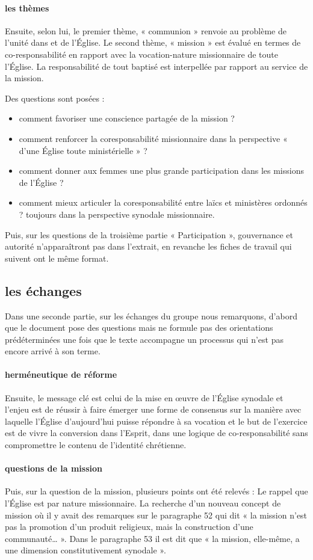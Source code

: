 \paragraph{les thèmes}
Ensuite, selon lui, le premier thème, « communion » renvoie au problème de l’unité dans et de l’Église. Le second thème, « mission » est évalué en termes de co-responsabilité en rapport avec la vocation-nature missionnaire de toute l’Église. La responsabilité de tout baptisé est interpellée par rapport au service de la mission. 

Des questions sont posées : \begin{itemize}
    \item comment favoriser une conscience partagée de la mission ? 
        \item comment renforcer la coresponsabilité missionnaire dans la perspective « d’une Église toute ministérielle » ? 
            \item comment donner aux femmes une plus grande participation dans les missions de l’Église ? 
     \item    comment mieux articuler la coresponsabilité entre laïcs et ministères ordonnés ? toujours dans la perspective synodale missionnaire.         
\end{itemize}Puis, sur les questions de la troisième partie « Participation », gouvernance et autorité n’apparaîtront pas dans l’extrait, en revanche les fiches de travail qui suivent ont le même format. 

\subsection{les échanges}
Dans une seconde partie, sur les échanges du groupe nous remarquons, d’abord que le document pose des questions mais ne formule pas des orientations prédéterminées une fois que le texte accompagne un processus qui n'est pas encore arrivé à son terme.
\paragraph{herméneutique de réforme}
Ensuite, le message clé est celui de la mise en œuvre de l’Église synodale et l’enjeu est de réussir à faire émerger une forme de consensus sur la manière avec laquelle l’Église d’aujourd’hui puisse répondre à sa vocation et le but de l’exercice est de vivre la conversion dans l’Esprit, dans une logique de co-responsabilité sans compromettre le contenu de l’identité chrétienne.  
\paragraph{questions de la mission}
Puis, sur la question de la mission, plusieurs points ont été relevés : Le rappel que l’Église est par nature missionnaire. La recherche d’un nouveau concept de mission où il y avait des remarques sur le paragraphe 52 qui dit « la mission n’est pas la promotion d’un produit religieux, mais la construction d’une communauté… ». Dans le paragraphe 53 il est dit que « la mission, elle-même, a une dimension constitutivement synodale ». 

